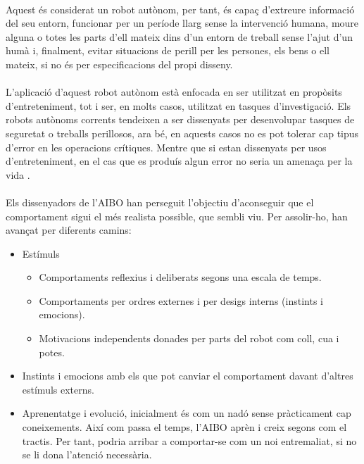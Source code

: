 \documentclass[12pt,a4paper,final,twoside]{article}
\begin{document}
\paragraph{}Aquest és considerat un robot autònom, per tant, és capaç d'extreure informació del seu entorn, funcionar per un període llarg sense la intervenció humana, moure alguna o totes les parts d'ell mateix dins d'un entorn de treball sense l'ajut d'un humà i, finalment, evitar situacions de perill per les persones, els bens o ell mateix, si no és per especificacions del propi disseny.

\paragraph{}L'aplicació d'aquest robot autònom està enfocada en ser utilitzat en propòsits d'entreteniment, tot i ser, en molts casos, utilitzat en tasques d'investigació. Els robots autònoms corrents tendeixen a ser dissenyats per desenvolupar tasques de seguretat o treballs perillosos, ara bé, en aquests casos no es pot tolerar cap tipus d'error en les operacions crítiques. Mentre que si estan dissenyats per usos d'entreteniment, en el cas que es produís algun error no seria un amenaça per la vida \cite{Fujita2000}.

\paragraph{}Els dissenyadors de l'AIBO han perseguit l'objectiu d'aconseguir que el comportament sigui el més realista possible, que sembli viu. Per assolir-ho, han avançat per diferents camins:
\begin{itemize}
\item Estímuls
\begin{itemize}
\item Comportaments reflexius i deliberats segons una escala de temps.
\item Comportaments per ordres externes i per desigs interns (instints i emocions).
\item Motivacions independents donades per parts del robot com coll, cua i potes.
\end{itemize}
\item Instints i emocions amb els que pot canviar el comportament davant d'altres estímuls externs.
\item Aprenentatge i evolució, inicialment és com un nadó sense pràcticament cap coneixements. Així com passa el temps, l'AIBO aprèn i creix segons com el tractis. Per tant, podria arribar a comportar-se com un noi entremaliat, si no se li dona l'atenció necessària.
\end{itemize}
\end{document}
